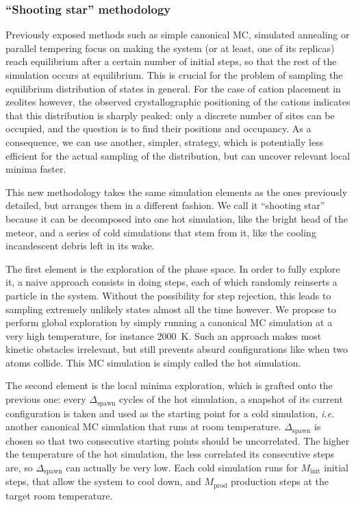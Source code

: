 \documentclass[main.tex]{subfiles}
\begin{document}
\subsubsection{``Shooting star'' methodology}

Previously exposed methods such as simple canonical MC, simulated annealing or parallel tempering focus on making the system (or at least, one of its replicas) reach equilibrium after a certain number of initial steps, so that the rest of the simulation occurs at equilibrium. This is crucial for the problem of sampling the equilibrium distribution of states in general. For the case of cation placement in zeolites however, the observed crystallographic positioning of the cations indicates that this distribution is sharply peaked: only a discrete number of sites can be occupied, and the question is to find their positions and occupancy. As a consequence, we can use another, simpler, strategy, which is potentially less efficient for the actual sampling of the distribution, but can uncover relevant local minima faster.

This new methodology takes the same simulation elements as the ones previously detailed, but arranges them in a different fashion. We call it ``shooting star'' because it can be decomposed into one hot simulation, like the bright head of the meteor, and a series of cold simulations that stem from it, like the cooling incandescent debris left in its wake.

The first element is the exploration of the phase space. In order to fully explore it, a naive approach consists in doing steps, each of which randomly reinserts a particle in the system. Without the possibility for step rejection, this leads to sampling extremely unlikely states almost all the time however. We propose to perform global exploration by simply running a canonical MC simulation at a very high temperature, for instance \qty{2000}{K}. Such an approach makes most kinetic obstacles irrelevant, but still prevents absurd configurations like when two atoms collide. This MC simulation is simply called the hot simulation.

The second element is the local minima exploration, which is grafted onto the previous one: every $\Delta_{\text{spawn}}$ cycles of the hot simulation, a snapshot of its current configuration is taken and used as the starting point for a cold simulation, \textit{i.e.} another canonical MC simulation that runs at room temperature. $\Delta_{\text{spawn}}$ is chosen so that two consecutive starting points should be uncorrelated. The higher the temperature of the hot simulation, the less correlated its consecutive steps are, so $\Delta_{\text{spawn}}$ can actually be very low. Each cold simulation runs for $M_\text{init}$ initial steps, that allow the system to cool down, and $M_\text{prod}$ production steps at the target room temperature.
\end{document}
